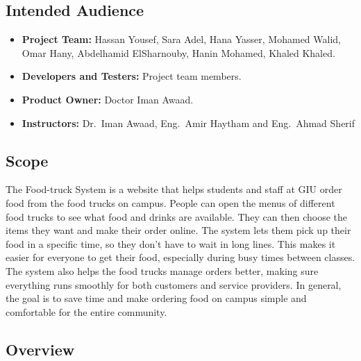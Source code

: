 \documentclass[12pt,a4paper]{article}
\begin{document}
\subsection{Intended Audience}
\begin{itemize}[leftmargin=2em, itemsep=8pt]
  \item \textbf{Project Team:} Hassan Yousef, Sara Adel, Hana Yasser, Mohamed Walid, Omar Hany, Abdelhamid ElSharnouby, Hanin Mohamed, Khaled Khaled.
  \item \textbf{Developers and Testers:} Project team members.
  \item \textbf{Product Owner:} Doctor Iman Awaad.
  \item \textbf{Instructors:} Dr.~Iman Awaad, Eng.~Amir Haytham and Eng.~Ahmad Sherif
\end{itemize}

\subsection{Scope}
The Food-truck System is a website that helps students and staff at GIU order food from the food trucks on campus. People can open the menus of different food trucks to see what food and drinks are available. They can then choose the items they want and make their order online. The system lets them pick up their food in a specific time, so they don't have to wait in long lines. This makes it easier for everyone to get their food, especially during busy times between classes. The system also helps the food trucks manage orders better, making sure everything runs smoothly for both customers and service providers. In general, the goal is to save time and make ordering food on campus simple and comfortable for the entire community.

\subsection{Overview}
\end{document}
